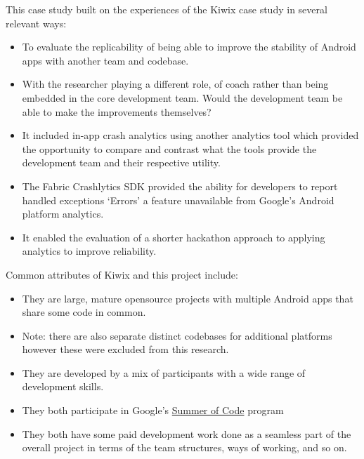 This case study built on the experiences of the Kiwix case study in several relevant ways:
\begin{itemize}
    \item To evaluate the replicability of being able to improve the stability of Android apps with another team and codebase.
    \item With the researcher playing a different role, of coach rather than being embedded in the core development team. Would the development team be able to make the improvements themselves?
    \item It included in-app crash analytics using another analytics tool which provided the opportunity to compare and contrast what the tools provide the development team and their respective utility. 
    \item The Fabric Crashlytics SDK provided the ability for developers to report handled exceptions `Errors' a feature unavailable from Google's Android platform analytics.
    \item It enabled the evaluation of a shorter hackathon approach to applying analytics to improve reliability.
\end{itemize}



Common attributes of Kiwix and this project include:
\begin{itemize}
    \item They are large, mature opensource projects with multiple Android apps that share some code in common. 
    \item Note: there are also separate distinct codebases for additional platforms however these were excluded from this research.
    \item They are developed by a mix of participants with a wide range of development skills.
    \item They both participate in Google's \href{https://summerofcode.withgoogle.com/}{Summer of Code} program
    \item They both have some paid development work done as a seamless part of the overall project in terms of the team structures, ways of working, and so on.
\end{itemize}

